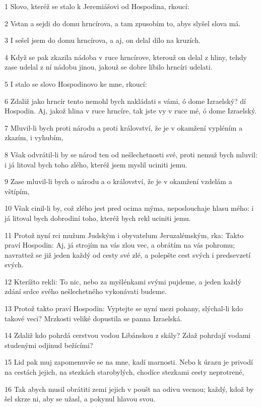 \par 1 Slovo, kteréž se stalo k Jeremiášovi od Hospodina, rkoucí:
\par 2 Vstan a sejdi do domu hrncírova, a tam zpusobím to, abys slyšel slova má.
\par 3 I sešel jsem do domu hrncírova, a aj, on delal dílo na kruzích.
\par 4 Když se pak zkazila nádoba v ruce hrncírove, kterouž on delal z hliny, tehdy zase udelal z ní nádobu jinou, jakouž se dobre líbilo hrncíri udelati.
\par 5 I stalo se slovo Hospodinovo ke mne, rkoucí:
\par 6 Zdaliž jako hrncír tento nemohl bych nakládati s vámi, ó dome Izraelský? dí Hospodin. Aj, jakož hlina v ruce hrncíre, tak jste vy v ruce mé, ó dome Izraelský.
\par 7 Mluvil-li bych proti národu a proti království, že je v okamžení vypléním a zkazím, i vyhubím,
\par 8 Však odvrátil-li by se národ ten od nešlechetnosti své, proti nemuž bych mluvil: i já litoval bych toho zlého, kteréž jsem myslil uciniti jemu.
\par 9 Zase mluvil-li bych o národu a o království, že je v okamžení vzdelám a vštípím,
\par 10 Však cinil-li by, což zlého jest pred ocima mýma, neposlouchaje hlasu mého: i já litoval bych dobrodiní toho, kteréž bych rekl uciniti jemu.
\par 11 Protož nyní rci mužum Judským i obyvatelum Jeruzalémským, rka: Takto praví Hospodin: Aj, já strojím na vás zlou vec, a obrátím na vás pohromu; navrattež se již jeden každý od cesty své zlé, a polepšte cest svých i predsevzetí svých.
\par 12 Kterížto rekli: To nic, nebo za myšlénkami svými pujdeme, a jeden každý zdání srdce svého nešlechetného vykonávati budeme.
\par 13 Protož takto praví Hospodin: Vyptejte se nyní mezi pohany, slýchal-li kdo takové veci? Mrzkosti veliké dopustila se panna Izraelská.
\par 14 Zdaliž kdo pohrdá cerstvou vodou Libánskou z skály? Zdaž pohrdají vodami studenými odjinud bežícími?
\par 15 Lid pak muj zapomenuvše se na mne, kadí marnosti. Nebo k úrazu je privodí na cestách jejich, na stezkách starobylých, chodíce stezkami cesty neprotrené,
\par 16 Tak abych musil obrátiti zemi jejich v poušt na odivu vecnou; každý, kdož by šel skrze ni, aby se užasl, a pokynul hlavou svou.
